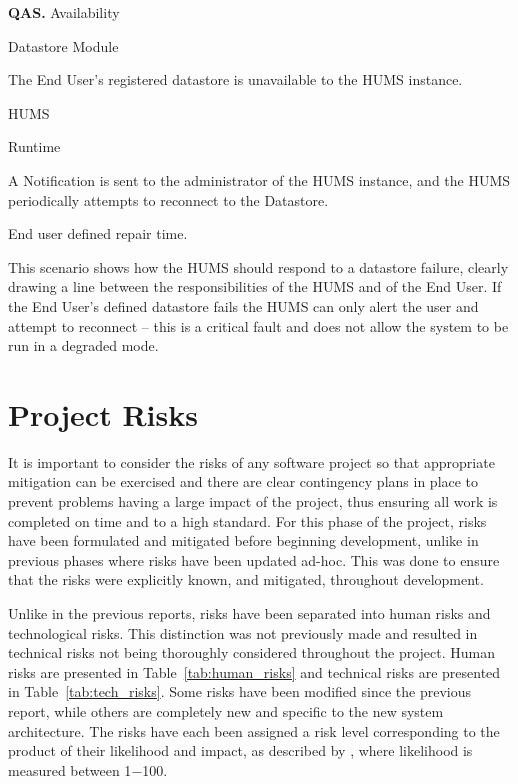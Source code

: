 \documentclass[10pt,a4paper]{article}
\newcommand{\qas}[1]{\textcolor{reqColor}{\textbf{QAS.#1}}}
\newenvironment{scenario}[1]{
\newcommand{\source}[1]{\item[Source of Stimulus:] ##1}
\newcommand{\stimulus}[1]{\item[Stimulus:] ##1}
\newcommand{\artifact}[1]{\item[Artifact:] ##1}
\newcommand{\environment}[1]{\item[Environment:] ##1}
\newcommand{\response}[1]{\item[Response:] ##1}
\newcommand{\measure}[1]{\item[Response Measure:] ##1}
\newcommand{\rationale}[1]{\item[Scenario Rationale:] ##1}
\newcommand{\quality}[1]{\item[Quality:] ##1}
		\begin{description} [noitemsep]	
		\item[Scenario ID:] \qas{#1}
		}{\end{description} \vspace*{0.3cm}
		}
\begin{document}
\begin{scenario}{4}
\quality{Availability}
\source{Datastore Module}
\stimulus{The End User's registered datastore is unavailable to the HUMS instance.}
\artifact{HUMS}
\environment{Runtime}
\response{A Notification is sent to the administrator of the HUMS instance, and the HUMS periodically attempts to reconnect to the Datastore.}
\measure{End user defined repair time.}
\rationale{This scenario shows how the HUMS should respond to a datastore failure, clearly drawing a line between the responsibilities of the HUMS and of the End User. If the End User's defined datastore fails the HUMS can only alert the user and attempt to reconnect -- this is a critical fault and does not allow the system to be run in a degraded mode.}
\end{scenario}

\section{Project Risks}
\label{sec:risks}
It is important to consider the risks of any software project so that appropriate mitigation can be exercised and there are clear contingency plans in place to prevent problems having a large impact of the project, thus ensuring all work is completed on time and to a high standard. For this phase of the project, risks have been formulated and mitigated before beginning development, unlike in previous phases where risks have been updated ad-hoc. This was done to ensure that the risks were explicitly known, and mitigated, throughout development. 

Unlike in the previous reports, risks have been separated into human risks and technological risks. This distinction was not previously made and resulted in technical risks not being thoroughly considered throughout the project. Human risks are presented in Table~\ref{tab:human_risks} and technical risks are presented in Table~\ref{tab:tech_risks}.
Some risks have been modified since the previous report, while others are completely new and specific to the new system architecture. The risks have each been assigned a risk level corresponding to the product of their likelihood and impact, as described by \cite{risks}, where likelihood is measured between 1$-$100.
\end{document}
